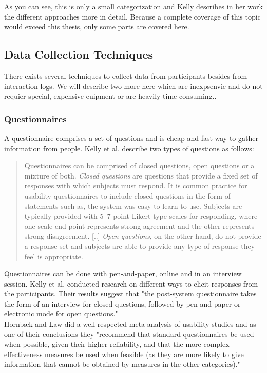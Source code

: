 \documentclass[11pt]{report}
\begin{document}
As you can see, this is only a small categorization and Kelly describes in her work the different approaches more in detail. Because a complete coverage of this topic would exceed this thesis, only some parts are covered here. 

\subsection{Data Collection Techniques}

There exists several techniques to collect data from participants besides from interaction logs. We will describe two more here which are inexpsenvie and do not requier special, expensive euipment or are heavily time-consuming..

\subsubsection{Questionnaires}

A questionnaire comprises a set of questions and is cheap and fast way to gather information from people. Kelly et al. \cite{Kelly2008} describe two types of questions as follows:

\begin{quote}
	Questionnaires can be comprised of closed questions, open questions or a mixture of both. \textit{Closed questions} are questions that provide a fixed set of responses with which subjects must respond. It is common practice for usability questionnaires to include closed questions in the form of statements such as, the system was easy to learn to use. Subjects are typically provided with 5–7-point Likert-type scales for responding, where one scale end-point represents strong agreement and the other represents strong disagreement. [..] \textit{Open questions}, on the other hand, do not provide a response set and subjects are able to provide any type of response they feel is appropriate. 
	\end{quote}

Questionnaires can be done with pen-and-paper, online and in an interview session. Kelly et al. \cite{Kelly2008} conducted research on different ways to elicit responses from the participants. Their results suggest that "the post-system questionnaire takes the form of an interview for closed questions, followed by pen-and-paper or electronic mode for open questions." \cite{Kelly2008} \\ 

Hornbæk and Law did a well respected meta-analysis of usability studies and as one of their conclusions they "recommend that standard questionnaires be used when possible, given their higher reliability, and that the more complex effectiveness measures be used when feasible (as they are more likely to give information that cannot be obtained by measures in the other categories)." \cite{Hornb2007} 
\end{document}
